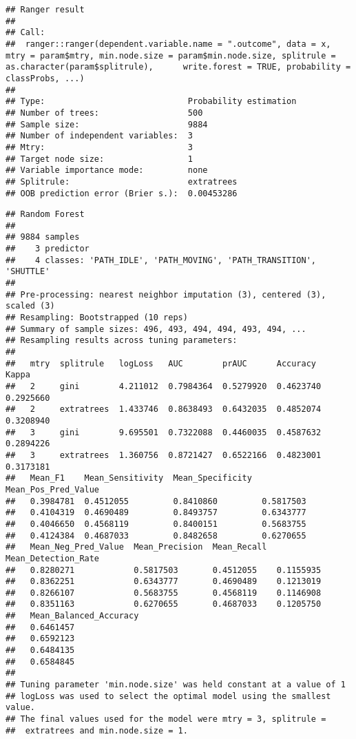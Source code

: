 \documentclass[]{article}
\begin{document}
\begin{verbatim}
## Ranger result
## 
## Call:
##  ranger::ranger(dependent.variable.name = ".outcome", data = x,      mtry = param$mtry, min.node.size = param$min.node.size, splitrule = as.character(param$splitrule),      write.forest = TRUE, probability = classProbs, ...) 
## 
## Type:                             Probability estimation 
## Number of trees:                  500 
## Sample size:                      9884 
## Number of independent variables:  3 
## Mtry:                             3 
## Target node size:                 1 
## Variable importance mode:         none 
## Splitrule:                        extratrees 
## OOB prediction error (Brier s.):  0.00453286
\end{verbatim}

\begin{verbatim}
## Random Forest 
## 
## 9884 samples
##    3 predictor
##    4 classes: 'PATH_IDLE', 'PATH_MOVING', 'PATH_TRANSITION', 'SHUTTLE' 
## 
## Pre-processing: nearest neighbor imputation (3), centered (3), scaled (3) 
## Resampling: Bootstrapped (10 reps) 
## Summary of sample sizes: 496, 493, 494, 494, 493, 494, ... 
## Resampling results across tuning parameters:
## 
##   mtry  splitrule   logLoss   AUC        prAUC      Accuracy   Kappa    
##   2     gini        4.211012  0.7984364  0.5279920  0.4623740  0.2925660
##   2     extratrees  1.433746  0.8638493  0.6432035  0.4852074  0.3208940
##   3     gini        9.695501  0.7322088  0.4460035  0.4587632  0.2894226
##   3     extratrees  1.360756  0.8721427  0.6522166  0.4823001  0.3173181
##   Mean_F1    Mean_Sensitivity  Mean_Specificity  Mean_Pos_Pred_Value
##   0.3984781  0.4512055         0.8410860         0.5817503          
##   0.4104319  0.4690489         0.8493757         0.6343777          
##   0.4046650  0.4568119         0.8400151         0.5683755          
##   0.4124384  0.4687033         0.8482658         0.6270655          
##   Mean_Neg_Pred_Value  Mean_Precision  Mean_Recall  Mean_Detection_Rate
##   0.8280271            0.5817503       0.4512055    0.1155935          
##   0.8362251            0.6343777       0.4690489    0.1213019          
##   0.8266107            0.5683755       0.4568119    0.1146908          
##   0.8351163            0.6270655       0.4687033    0.1205750          
##   Mean_Balanced_Accuracy
##   0.6461457             
##   0.6592123             
##   0.6484135             
##   0.6584845             
## 
## Tuning parameter 'min.node.size' was held constant at a value of 1
## logLoss was used to select the optimal model using the smallest value.
## The final values used for the model were mtry = 3, splitrule =
##  extratrees and min.node.size = 1.
\end{verbatim}
\end{document}
